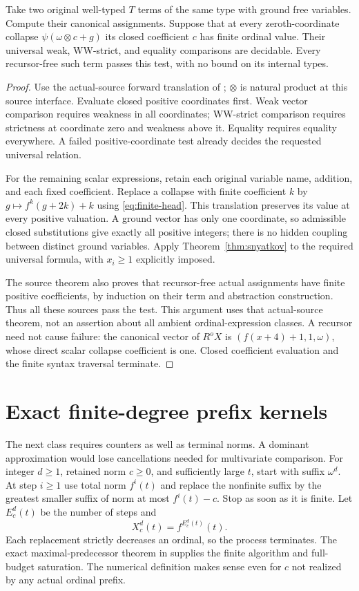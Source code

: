 \documentclass[11pt]{article}
\begin{document}
\begin{theorem}\label{thm:finite-source}
Take two original well-typed $T$ terms of the same type with ground free
variables. Compute their canonical assignments. Suppose that at every
zeroth-coordinate collapse $\psi(\omega\otimes c+g)$ its closed coefficient
$c$ has finite ordinal value. Their universal weak, WW-strict, and equality
comparisons are decidable. Every recursor-free such term passes this test,
with no bound on its internal types.
\end{theorem}
\begin{proof}
Use the actual-source forward translation of \cite{wwfoundations};
$\otimes$ is natural product at this source interface. Evaluate closed
positive coordinates first. Weak vector comparison requires weakness in
all coordinates; WW-strict comparison requires strictness at coordinate
zero and weakness above it. Equality requires equality everywhere. A failed
positive-coordinate test already decides the requested universal relation.

For the remaining scalar expressions, retain each original variable name,
addition, and each fixed coefficient. Replace a collapse with finite
coefficient $k$ by $g\mapsto f^k(g+2k)+k$ using
\eqref{eq:finite-head}. This translation preserves its value at every
positive valuation. A ground vector has only one coordinate, so admissible
closed substitutions give exactly all positive integers; there is no hidden
coupling between distinct ground variables. Apply Theorem~\ref{thm:snyatkov}
to the required universal formula, with $x_i\ge1$ explicitly imposed.

The source theorem also proves that recursor-free actual assignments have
finite positive coefficients, by induction on their term and abstraction
construction. Thus all these sources pass the test. This argument uses that
actual-source theorem, not an assertion about all ambient ordinal-expression
classes. A recursor need not cause failure: the canonical vector of $R^oX$
is $(f(x+4)+1,1,\omega)$, whose direct scalar collapse coefficient is one.
Closed coefficient evaluation and the finite syntax traversal terminate.
\end{proof}

\section{Exact finite-degree prefix kernels}
The next class requires counters as well as terminal norms. A dominant
approximation would lose cancellations needed for multivariate comparison.
For integer $d\ge1$, retained norm $c\ge0$, and sufficiently large $t$, start
with suffix $\omega^d$. At step $i\ge1$ use total norm $f^i(t)$ and replace
the nonfinite suffix by the greatest smaller suffix of norm at most
$f^i(t)-c$. Stop as soon as it is finite. Let $E^d_c(t)$ be the number of
steps and
\[
 X^d_c(t)=f^{E^d_c(t)}(t).
\]
Each replacement strictly decreases an ordinal, so the process terminates.
The exact maximal-predecessor theorem in \cite{wwfoundations} supplies the
finite algorithm and full-budget saturation. The numerical definition makes
sense even for $c$ not realized by any actual ordinal prefix.
\end{document}
